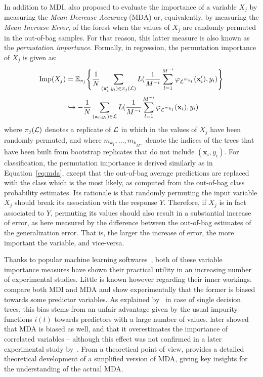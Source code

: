 In addition to MDI, \cite{breiman:2001,breiman:2002} also proposed to evaluate
the importance of a variable $X_j$ by measuring the \textit{Mean Decrease
Accuracy} (MDA) or, equivalently, by measuring the \textit{Mean Increase Error},
of the forest when the values of $X_j$ are randomly permuted in the out-of-bag
samples. For that reason, this latter measure is also known as the
\textit{permutation importance}. Formally, in regression, the permutation
importance of $X_j$ is given as:
\begin{align}\label{eq:mda}
\text{Imp}(X_j) &=  \mathbb{E}_{\pi_j} \Bigg\{ \frac{1}{N} \sum_{(\mathbf{x}_i^\prime,y_i) \in \pi_j({\cal L})} L(\frac{1}{M^{-i}} \sum_{l=1}^{M^{-i}} \varphi_{{\cal L}^{m_{k_l}}}(\mathbf{x}_i^\prime), y_i) \Bigg\} \nonumber  \\
&\hookrightarrow - \frac{1}{N} \sum_{(\mathbf{x}_i,y_i) \in {\cal L}} L(\frac{1}{M^{-i}} \sum_{l=1}^{M^{-i}} \varphi_{{\cal L}^{m_{k_l}}}(\mathbf{x}_i), y_i)
\end{align}
where $\pi_j({\cal L})$ denotes a replicate of ${\cal L}$ in which in the
values of $X_j$ have been randomly permuted, and where
$m_{k_1},\dots,m_{k_{M^{-i}}}$ denote the indices of the trees that have been
built from bootstrap replicates that do not include $(\mathbf{x}_i, y_i)$. For
classification, the permutation importance is derived similarly as in
Equation~\ref{eq:mda}, except  that the out-of-bag average predictions are
replaced with the class which is the most likely, as computed from the out-of-bag
class probability estimates. Its rationale is that randomly permuting the
input variable $X_j$ should break its association with the response $Y$.
Therefore, if $X_j$ is in fact associated to $Y$, permuting its values should
also result in a substantial increase of error, as here measured by the
difference between the out-of-bag estimates of the generalization error. That
is, the larger the increase of error, the more important the variable, and
vice-versa.

Thanks to popular machine learning
softwares~\citep{breiman:2002,liaw:2002,pedregosa:2011},
both of these variable importance measures have shown their practical utility in
an increasing number of experimental studies. Little is known however regarding
their inner workings. \cite{strobl:2007b} compare both MDI and MDA and show
experimentally that the former is biased towards some predictor variables. As
explained by~\cite{white:1994} in case of single decision trees, this
bias stems from an unfair advantage given by the usual impurity functions $i(t)$
towards predictors with a large number of values. \cite{strobl:2008}
later showed  that MDA is biased as well, and that it overestimates the
importance of correlated variables -- although this effect was not confirmed in
a later experimental study by~\cite{genuer:2010}.  From a theoretical
point of view, \cite{ishwaran:2007} provides a detailed theoretical
development of a simplified version of MDA, giving key insights for the
understanding of the actual MDA.

